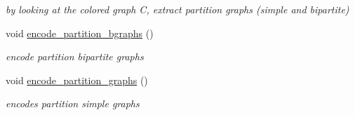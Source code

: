 \begin{DoxyCompactItemize}
\begin{DoxyCompactList}\small\item\em by looking at the colored graph C, extract partition graphs (simple and bipartite) \end{DoxyCompactList}\item 
void \hyperlink{classmarked__graph__encoder_aa113c4870e3221faa332b2151b63d9e6}{encode\+\_\+partition\+\_\+bgraphs} ()
\begin{DoxyCompactList}\small\item\em encode partition bipartite graphs \end{DoxyCompactList}\item 
void \hyperlink{classmarked__graph__encoder_a654463d4b256b84225f5944b5e361ebf}{encode\+\_\+partition\+\_\+graphs} ()
\begin{DoxyCompactList}\small\item\em encodes partition simple graphs \end{DoxyCompactList}\end{DoxyCompactItemize}
